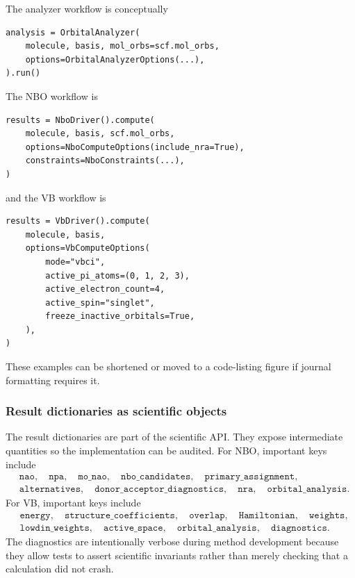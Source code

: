 \documentclass[11pt]{article}
\begin{document}
The analyzer workflow is conceptually
\begin{verbatim}
analysis = OrbitalAnalyzer(
    molecule, basis, mol_orbs=scf.mol_orbs,
    options=OrbitalAnalyzerOptions(...),
).run()
\end{verbatim}
The NBO workflow is
\begin{verbatim}
results = NboDriver().compute(
    molecule, basis, scf.mol_orbs,
    options=NboComputeOptions(include_nra=True),
    constraints=NboConstraints(...),
)
\end{verbatim}
and the VB workflow is
\begin{verbatim}
results = VbDriver().compute(
    molecule, basis,
    options=VbComputeOptions(
        mode="vbci",
        active_pi_atoms=(0, 1, 2, 3),
        active_electron_count=4,
        active_spin="singlet",
        freeze_inactive_orbitals=True,
    ),
)
\end{verbatim}
These examples can be shortened or moved to a code-listing figure if journal formatting requires it.

\subsubsection*{Result dictionaries as scientific objects}

The result dictionaries are part of the scientific API.  They expose intermediate quantities so the implementation can be audited.  For NBO, important keys include
\begin{equation}
\begin{aligned}
	&\texttt{nao},\quad \texttt{npa},\quad \texttt{mo\_nao},\quad
	\texttt{nbo\_candidates},\quad \texttt{primary\_assignment}, \\
	&\texttt{alternatives},\quad \texttt{donor\_acceptor\_diagnostics},
	\quad \texttt{nra},\quad \texttt{orbital\_analysis}.
\end{aligned}
\end{equation}
For VB, important keys include
\begin{equation}
\begin{aligned}
	&\texttt{energy},\quad \texttt{structure\_coefficients},\quad
	\texttt{overlap},\quad \texttt{Hamiltonian},\quad \texttt{weights}, \\
	&\texttt{lowdin\_weights},\quad \texttt{active\_space},\quad
	\texttt{orbital\_analysis},\quad \texttt{diagnostics}.
\end{aligned}
\end{equation}
The diagnostics are intentionally verbose during method development because they allow tests to assert scientific invariants rather than merely checking that a calculation did not crash.
\end{document}
